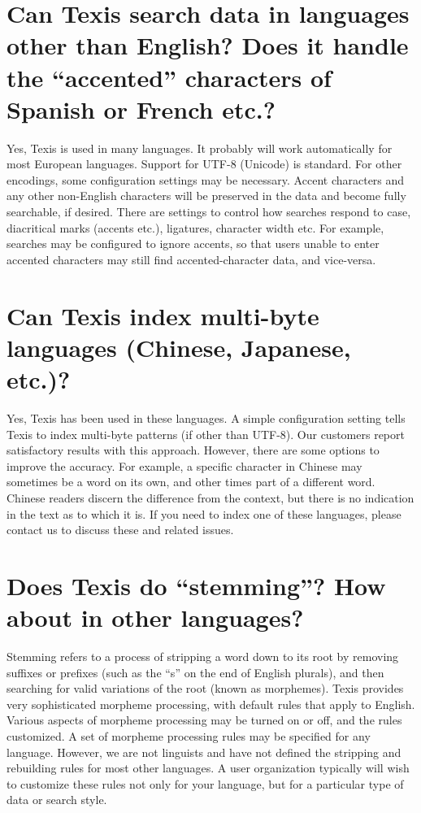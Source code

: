 \section{Can Texis search data in languages other than English? Does it handle the ``accented'' characters of Spanish or French etc.? }

Yes, Texis is used in many languages.  It probably will work
automatically for most European languages.  Support for UTF-8
(Unicode) is standard.  For other encodings, some configuration
settings may be necessary.  Accent characters and any other
non-English characters will be preserved in the data and become fully
searchable, if desired.  There are settings to control how searches
respond to case, diacritical marks (accents etc.), ligatures,
character width etc.  For example, searches may be configured to
ignore accents, so that users unable to enter accented characters may
still find accented-character data, and vice-versa.

\section{Can Texis index multi-byte languages (Chinese, Japanese, etc.)? }

Yes, Texis has been used in these languages.  A simple configuration
setting tells Texis to index multi-byte patterns (if other than
UTF-8).  Our customers report satisfactory results with this approach.
However, there are some options to improve the accuracy.  For example,
a specific character in Chinese may sometimes be a word on its own,
and other times part of a different word.  Chinese readers discern the
difference from the context, but there is no indication in the text as
to which it is.  If you need to index one of these languages, please
contact us to discuss these and related issues.

\section{Does Texis do ``stemming''? How about in other languages? }

Stemming refers to a process of stripping a word down to its root by
removing suffixes or prefixes (such as the ``s'' on the end of English
plurals), and then searching for valid variations of the root (known
as morphemes).  Texis provides very sophisticated morpheme processing,
with default rules that apply to English.  Various aspects of morpheme
processing may be turned on or off, and the rules customized.  A set
of morpheme processing rules may be specified for any language.
However, we are not linguists and have not defined the stripping and
rebuilding rules for most other languages.  A user organization
typically will wish to customize these rules not only for your
language, but for a particular type of data or search style.

